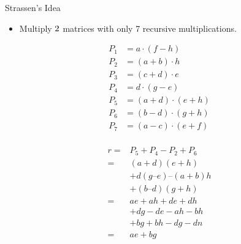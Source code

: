 \documentclass{beamer}
\begin{document}
\begin{frame}{Strassen's Idea}
    \begin{itemize}
        \item Multiply $2 \time 2$ matrices with only 7 recursive multiplications.
    \end{itemize}
    \begin{minipage}{0.48\textwidth}
        \begin{equation*}
            \begin{split}
                P_1 &= a \cdot (f - h) \\
                P_2 &= (a + b) \cdot h \\
                P_3 &= (c + d) \cdot e \\
                P_4 &= d \cdot (g - e) \\
                P_5 &= (a + d) \cdot (e + h) \\
                P_6 &= (b - d) \cdot (g + h) \\
                P_7 &= (a - c) \cdot (e + f) \\
            \end{split}
        \end{equation*}
    \end{minipage} %
    \hfill
    \begin{minipage}{0.48\textwidth}
        \begin{equation*}
            \begin{split}
                r =& P_5 + P_4 - P_2 + P_6 \\
                  =& (a + d)(e + h) \\
                   & + d(g – e) – (a + b) h \\
                   & + (b – d)(g + h) \\
                  =& ae + ah + de + dh \\
                   & + dg - de - ah - bh \\
                   & +bg + bh - dg-dn \\
                  =& ae + bg \\
            \end{split}
        \end{equation*}
    \end{minipage}
\end{frame}
\end{document}
